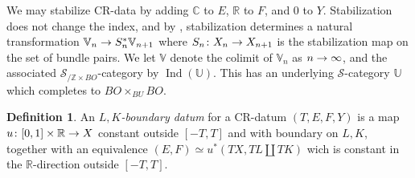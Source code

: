 \documentclass[10pt]{amsart}
\numberwithin{equation}{section}
\theoremstyle{definition}
\newtheorem{definition}[prop]{Definition}
\DeclareMathOperator{\Ind}{Ind}
\newcommand{\bC}{\mathbb{C}}
\newcommand{\bZ}{\mathbb{Z}}
\newcommand{\bR}{\mathbb{R}}
\newcommand{\bU}{\mathbb{U}}
\newcommand{\bV}{\mathbb{V}}
\newcommand{\cS}{\mathcal{S}}
\renewcommand{\to}{\mathchoice{\longrightarrow}{\rightarrow}{}{}}
\begin{document}
	 We may stabilize CR-data by adding $\bC$ to $E$, $\bR$ to $F$, and $0$ to $Y$.
   Stabilization does not change the index, and by \cite[Proposition 3.21]{porcelli2024spectral}, stabilization determines a natural transformation $\bV_{n}\to S_{n}^{*}\bV_{n+1}$ where $S_{n}\colon X_{n}\to X_{n+1}$ is the stabilization map on the set of bundle pairs.
   We let $\bV$ denote the colimit of $\bV_{n}$ as $n\to \infty$, and the associated $\cS_{/ \bZ\times BO}$-category by $\Ind(\bU)$.
   This has an underlying $\cS$-category $\bU$ which completes to $BO\times_{BU}BO$.


	\begin{definition}
		An \emph{$L,K$-boundary datum} for a CR-datum $(T,E,F,Y)$ is a map $u\colon [0,1]\times \bR \to X$ constant outside $[-T,T]$ and with boundary on $L,K$, together with an equivalence $(E,F)\simeq u^{*}(TX, TL\amalg TK)$ wich is constant in the $\bR$-direction outside $[-T,T]$.
	\end{definition}
\end{document}
